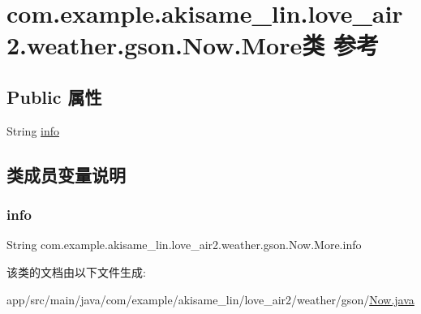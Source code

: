 \hypertarget{classcom_1_1example_1_1akisame__lin_1_1love__air2_1_1weather_1_1gson_1_1_now_1_1_more}{}\section{com.\+example.\+akisame\+\_\+lin.\+love\+\_\+air2.\+weather.\+gson.\+Now.\+More类 参考}
\label{classcom_1_1example_1_1akisame__lin_1_1love__air2_1_1weather_1_1gson_1_1_now_1_1_more}
\subsection*{Public 属性}
\begin{DoxyCompactItemize}
\item 
String \mbox{\hyperlink{classcom_1_1example_1_1akisame__lin_1_1love__air2_1_1weather_1_1gson_1_1_now_1_1_more_a30fc86e8cd4ba7826d3ad02bb07717d1}{info}}
\end{DoxyCompactItemize}


\subsection{类成员变量说明}
\mbox{\label{classcom_1_1example_1_1akisame__lin_1_1love__air2_1_1weather_1_1gson_1_1_now_1_1_more_a30fc86e8cd4ba7826d3ad02bb07717d1}} 
\subsubsection{\texorpdfstring{info}{info}}
{\footnotesize\ttfamily String com.\+example.\+akisame\+\_\+lin.\+love\+\_\+air2.\+weather.\+gson.\+Now.\+More.\+info}



该类的文档由以下文件生成\+:\begin{DoxyCompactItemize}
\item 
app/src/main/java/com/example/akisame\+\_\+lin/love\+\_\+air2/weather/gson/\mbox{\hyperlink{java_2com_2example_2akisame__lin_2love__air2_2weather_2gson_2_now_8java}{Now.\+java}}\end{DoxyCompactItemize}
